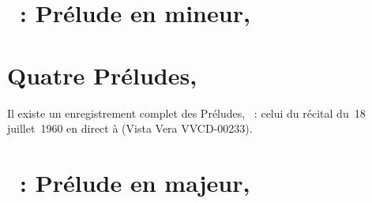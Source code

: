 \section{\ifChrono \Scriabine{}~: \fi
Prélude en \kG mineur,  }
\label{\thesection}

\begin{workitemize}
 \item{}
 \begin{perfitemize}
  \item{}
  \item{}
 \end{perfitemize}
 \item{}
 \begin{perfitemize}
  \item{}
 \end{perfitemize}
\end{workitemize}

\section*{%
Quatre Préludes, }

Il existe un enregistrement complet des Préludes, ~: celui du
récital du~18 juillet~1960 en direct à \MSHM (Vista Vera VVCD-00233).

\section{\ifChrono \Scriabine{}~: \fi
Prélude en \kF \Sharp majeur,  }
\label{\thesection}

\begin{workitemize}
 \item{}
 \begin{perfitemize}
  \item{}
 \end{perfitemize}
\end{workitemize}


